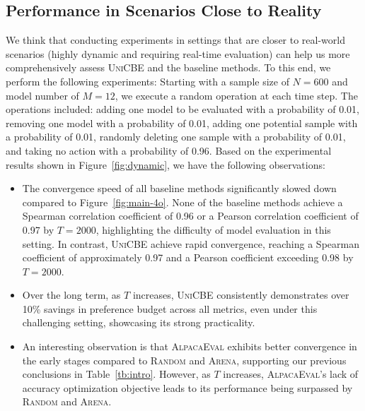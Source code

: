 \subsection{Performance in Scenarios Close to Reality}
We think that conducting experiments in settings that are closer to real-world scenarios (highly dynamic and requiring real-time evaluation) can help us more comprehensively assess \textsc{UniCBE} and the baseline methods. To this end, we perform the following experiments: Starting with a sample size of $N=600$ and model number of $M=12$, we execute a random operation at each time step. The operations included: adding one model to be evaluated with a probability of 0.01, removing one model with a probability of 0.01, adding one potential sample with a probability of 0.01, randomly deleting one sample with a probability of 0.01, and taking no action with a probability of 0.96. Based on the experimental results shown in Figure~\ref{fig:dynamic}, we have the following observations:
\begin{itemize}[leftmargin=20pt]
\setlength{\itemsep}{0pt}
\setlength{\parsep}{0pt}
\setlength{\parskip}{0pt}
\item The convergence speed of all baseline methods significantly slowed down compared to Figure~\ref{fig:main-4o}. None of the baseline methods achieve a Spearman correlation coefficient of 0.96 or a Pearson correlation coefficient of 0.97 by $T=2000$, highlighting the difficulty of model evaluation in this setting. In contrast, \textsc{UniCBE} achieve rapid convergence, reaching a Spearman coefficient of approximately 0.97 and a Pearson coefficient exceeding 0.98 by $T=2000$.
\item Over the long term, as $T$ increases, \textsc{UniCBE} consistently demonstrates over 10\% savings in preference budget across all metrics, even under this challenging setting, showcasing its strong practicality.
\item An interesting observation is that \textsc{AlpacaEval} exhibits better convergence in the early stages compared to \textsc{Random} and \textsc{Arena}, supporting our previous conclusions in Table~\ref{tb:intro}. However, as $T$ increases, \textsc{AlpacaEval}'s lack of accuracy optimization objective leads to its performance being surpassed by \textsc{Random} and \textsc{Arena}.
\end{itemize} 

